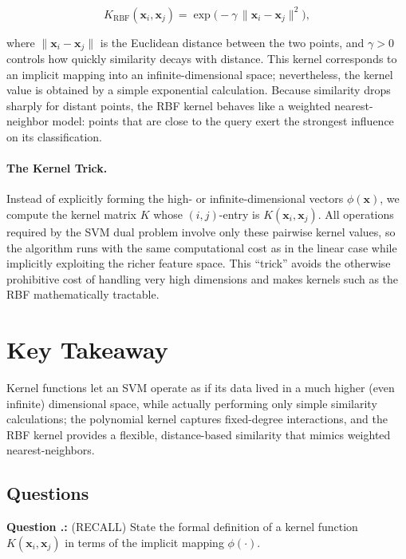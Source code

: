 \documentclass[12pt, a4paper]{article}
\newcounter{question}[section]
\renewcommand{\thequestion}{\thesection.\arabic{question}}
\newenvironment{question}
  {\refstepcounter{question}\par\noindent\textbf{Question \thequestion:}}
  {\par}
\begin{document}
\[
K_{\text{RBF}}(\mathbf{x}_i,\mathbf{x}_j)=\exp\!\bigl(-\gamma \,\|\mathbf{x}_i-\mathbf{x}_j\|^{2}\bigr),
\]

where \(\|\mathbf{x}_i-\mathbf{x}_j\|\) is the Euclidean distance between the two points, and \(\gamma>0\) controls how quickly similarity decays with distance.  This kernel corresponds to an implicit mapping into an infinite-dimensional space; nevertheless, the kernel value is obtained by a simple exponential calculation.  Because similarity drops sharply for distant points, the RBF kernel behaves like a weighted nearest-neighbor model: points that are close to the query exert the strongest influence on its classification.

\paragraph{The Kernel Trick.}  
Instead of explicitly forming the high- or infinite-dimensional vectors \(\phi(\mathbf{x})\), we compute the kernel matrix \(K\) whose \((i,j)\)-entry is \(K(\mathbf{x}_i,\mathbf{x}_j)\).  All operations required by the SVM dual problem involve only these pairwise kernel values, so the algorithm runs with the same computational cost as in the linear case while implicitly exploiting the richer feature space.  This ``trick'' avoids the otherwise prohibitive cost of handling very high dimensions and makes kernels such as the RBF mathematically tractable.

\section{Key Takeaway}
Kernel functions let an SVM operate as if its data lived in a much higher (even infinite) dimensional space, while actually performing only simple similarity calculations; the polynomial kernel captures fixed-degree interactions, and the RBF kernel provides a flexible, distance-based similarity that mimics weighted nearest-neighbors.

\newpage
\subsection*{Questions}

\begin{question}
(RECALL) State the formal definition of a kernel function $K(\mathbf{x}_i,\mathbf{x}_j)$ in terms of the implicit mapping $\phi(\cdot)$.
\end{question}
\end{document}
